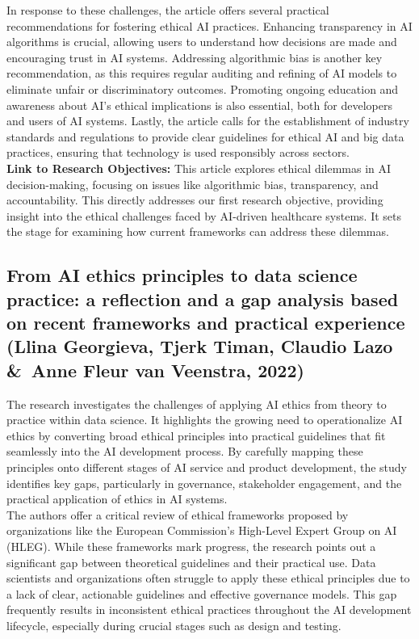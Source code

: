 \documentclass[a4paper, 12pt]{article}
\begin{document}
In response to these challenges, the article offers several practical recommendations for fostering ethical AI practices. Enhancing transparency in AI algorithms is crucial, allowing users to understand how decisions are made and encouraging trust in AI systems. Addressing algorithmic bias is another key recommendation, as this requires regular auditing and refining of AI models to eliminate unfair or discriminatory outcomes. Promoting ongoing education and awareness about AI’s ethical implications is also essential, both for developers and users of AI systems. Lastly, the article calls for the establishment of industry standards and regulations to provide clear guidelines for ethical AI and big data practices, ensuring that technology is used responsibly across sectors.\\

\textbf{Link to Research Objectives:} This article explores ethical dilemmas in AI decision-making, focusing on issues like algorithmic bias, transparency, and accountability. This directly addresses our first research objective, providing insight into the ethical challenges faced by AI-driven healthcare systems. It sets the stage for examining how current frameworks can address these dilemmas.


\subsection{From AI ethics principles to data science practice: a reflection and a gap analysis based on recent frameworks and practical experience (Llina Georgieva, Tjerk Timan, Claudio Lazo \&\ Anne Fleur van Veenstra, 2022)}
The research investigates the challenges of applying AI ethics from theory to practice within data science. It highlights the growing need to operationalize AI ethics by converting broad ethical principles into practical guidelines that fit seamlessly into the AI development process. By carefully mapping these principles onto different stages of AI service and product development, the study identifies key gaps, particularly in governance, stakeholder engagement, and the practical application of ethics in AI systems.\\

The authors offer a critical review of ethical frameworks proposed by organizations like the European Commission’s High-Level Expert Group on AI (HLEG). While these frameworks mark progress, the research points out a significant gap between theoretical guidelines and their practical use. Data scientists and organizations often struggle to apply these ethical principles due to a lack of clear, actionable guidelines and effective governance models. This gap frequently results in inconsistent ethical practices throughout the AI development lifecycle, especially during crucial stages such as design and testing.\\
\end{document}
